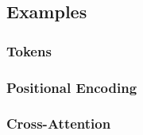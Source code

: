 \subsection{Examples}
\subsubsection{Tokens}
\begin{example}
\end{example}

\subsubsection{Positional Encoding}
\begin{example}
\end{example}
\newpage

\subsubsection{Cross-Attention}
\begin{example}
\end{example}
